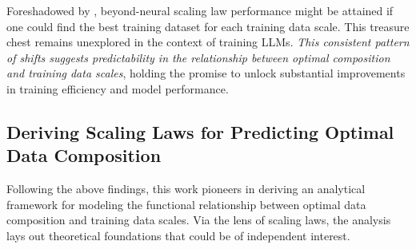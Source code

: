 \documentclass{article} %
\newcommand{\kang}[1]{\textbf{\textcolor{cyan}{[Feiyang: #1]}}}
\begin{document}
Foreshadowed by \citep{sorscher2022beyond, goyal2024science}, beyond-neural scaling law performance might be attained if one could find the best training dataset for each training data scale. This treasure chest remains unexplored in the context of training LLMs. \textit{This consistent pattern of shifts suggests predictability in the relationship between optimal composition and training data scales}, holding the promise to unlock substantial improvements in training efficiency and model performance.







\subsection{Deriving Scaling Laws for Predicting Optimal Data Composition}\label{sec:33n}
Following the above findings, this work pioneers in deriving an analytical framework for modeling the functional relationship between optimal data composition and training data scales. Via the lens of scaling laws, the analysis lays out theoretical foundations that could be of independent interest.
\end{document}
